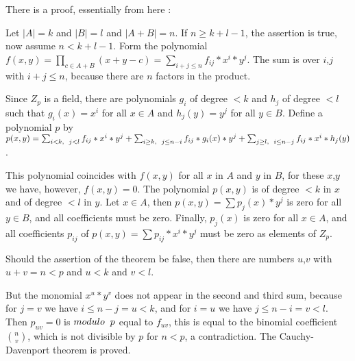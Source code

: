 \documentclass[12pt]{article}
\begin{document}
There is a proof, essentially from here :

Let $|A|=k$ and $|B|=l$ and $|A+B|=n$.
If $n\ge k+l-1$, the assertion is true, now assume $n<k+l-1$.
Form the polynomial $f(x,y)=\prod_{c \in A+B} (x+y-c)=\sum_{i+j \le n} f_{ij}*x^i*y^j$.
The sum is over $i$,$j$ with $i+j\le n$, because there are $n$ factors in the product.

Since $Z_p$ is a field, there are polynomials $g_i$ of degree $<k$ and $h_j$ of degree $<l$ such that $g_i(x)=x^i$ for all $x \in A$ and $h_j(y)=y^j$ for all $y \in B$.
Define a polynomial $p$ by
$p(x,y)=\sum_{i<k,\hspace{2 mm}j<l}f_{ij}*x^i*y^j+\sum_{i\ge k,\hspace{2 mm}j\le n-i}f_{ij}*g_i(x)*y^j+\sum_{j\ge l,\hspace{2 mm}i\le n-j}f_{ij}*x^i*h_j(y)$.

This polynomial coincides with $f(x,y)$ for all $x$ in $A$ and $y$ in $B$, for these $x$,$y$ we have, however, $f(x,y)=0$.
The polynomial $p(x,y)$ is of degree $<k$ in $x$ and of degree $<l$ in $y$.
Let $x \in A$, then $p(x,y)=\sum p_j(x)*y^j$ is zero for all $y \in B$, and all coefficients must be zero. Finally, $p_j(x)$ is zero for all $x \in A$, and all coefficients $p_{ij}$ of $p(x,y)=\sum p_{ij}*x^i*y^j$ must be zero as elements of $Z_p$.

Should the assertion of the theorem be false, then there are numbers $u$,$v$ with $u+v=n<p$ and $u<k$ and $v<l$.

But the monomial $x^u*y^v$ does not appear in the second and third sum, because for $j=v$ we have $i\le n-j=u<k$, and for $i=u$ we have $j\le n-i=v<l$.
Then $p_{uv}=0$ is $modulo\hspace{2 mm}p$ equal to $f_{uv}$, this is equal to the binomial coefficient $n \choose v$, which is not divisible by $p$ for $n<p$, a contradiction.
The Cauchy-Davenport theorem is proved.
\end{document}
